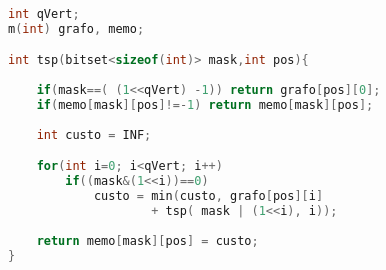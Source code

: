 \begin{lstlisting}[language=C++, title=Toma cuidado que essa porra aki é $O(n^2*2^n)$]
int qVert;
m(int) grafo, memo;

int tsp(bitset<sizeof(int)> mask,int pos){
    
    if(mask==( (1<<qVert) -1)) return grafo[pos][0];
    if(memo[mask][pos]!=-1) return memo[mask][pos];
    
    int custo = INF;

    for(int i=0; i<qVert; i++)
        if((mask&(1<<i))==0)
            custo = min(custo, grafo[pos][i]
                    + tsp( mask | (1<<i), i));
    
    return memo[mask][pos] = custo;
} 
\end{lstlisting}